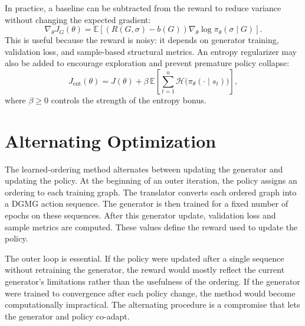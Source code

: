 In practice, a baseline can be subtracted from the reward to reduce variance without changing the expected gradient:
\begin{equation}
    \nabla_\theta J_G(\theta)
    = \mathbb{E}\left[(R(G,\sigma)-b(G))\nabla_\theta\log\pi_\theta(\sigma\mid G)\right].
\end{equation}
This is useful because the reward is noisy: it depends on generator training, validation loss, and sample-based structural metrics. An entropy regularizer may also be added to encourage exploration and prevent premature policy collapse:
\begin{equation}
    J_{\mathrm{ent}}(\theta)
    = J(\theta) + \beta\,\mathbb{E}\!\left[\sum_{t=1}^{n}\mathcal{H}\bigl(\pi_\theta(\cdot\mid s_t)\bigr)\right],
\end{equation}
where $\beta\ge0$ controls the strength of the entropy bonus.

\section{Alternating Optimization}
\label{sec:rl-alternating-optimization}

The learned-ordering method alternates between updating the generator and updating the policy. At the beginning of an outer iteration, the policy assigns an ordering to each training graph. The translator converts each ordered graph into a DGMG action sequence. The generator is then trained for a fixed number of epochs on these sequences. After this generator update, validation loss and sample metrics are computed. These values define the reward used to update the policy.

The outer loop is essential. If the policy were updated after a single sequence without retraining the generator, the reward would mostly reflect the current generator's limitations rather than the usefulness of the ordering. If the generator were trained to convergence after each policy change, the method would become computationally impractical. The alternating procedure is a compromise that lets the generator and policy co-adapt.

